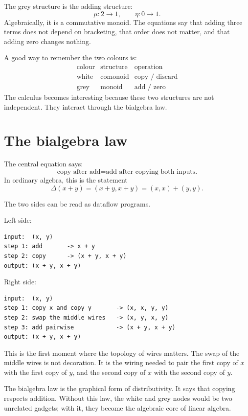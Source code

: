 The grey structure is the adding structure:
\[
  \mu:2\to1,\qquad \eta:0\to1.
\]
Algebraically, it is a commutative monoid.  The equations say that adding three terms does not depend on bracketing, that order does not matter, and that adding zero changes nothing.

A good way to remember the two colours is:
\[
\begin{array}{c|c|c}
\text{colour} & \text{structure} & \text{operation}\\
\hline
\text{white} & \text{comonoid} & \text{copy / discard}\\
\text{grey} & \text{monoid} & \text{add / zero}
\end{array}
\]
The calculus becomes interesting because these two structures are not independent.  They interact through the bialgebra law.

\section{The bialgebra law}

The central equation says:
\[
  \text{copy after add}=\text{add after copying both inputs.}
\]
In ordinary algebra, this is the statement
\[
  \Delta(x+y)=(x+y,x+y)=(x,x)+(y,y).
\]

The two sides can be read as dataflow programs.

Left side:
\begin{verbatim}
input:  (x, y)
step 1: add       -> x + y
step 2: copy      -> (x + y, x + y)
output: (x + y, x + y)
\end{verbatim}

Right side:
\begin{verbatim}
input:  (x, y)
step 1: copy x and copy y       -> (x, x, y, y)
step 2: swap the middle wires   -> (x, y, x, y)
step 3: add pairwise            -> (x + y, x + y)
output: (x + y, x + y)
\end{verbatim}

This is the first moment where the topology of wires matters.  The swap of the middle wires is not decoration.  It is the wiring needed to pair the first copy of \(x\) with the first copy of \(y\), and the second copy of \(x\) with the second copy of \(y\).

\begin{remark}
The bialgebra law is the graphical form of distributivity.  It says that copying respects addition.  Without this law, the white and grey nodes would be two unrelated gadgets; with it, they become the algebraic core of linear algebra.
\end{remark}

